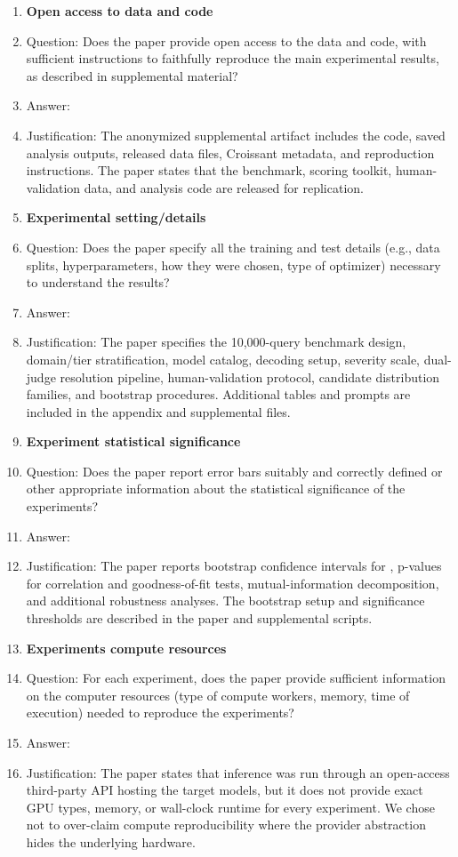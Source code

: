 \begin{enumerate}
\item {\bf Open access to data and code}
    \item[] Question: Does the paper provide open access to the data and code, with sufficient instructions to faithfully reproduce the main experimental results, as described in supplemental material?
    \item[] Answer: \answerYes{}
    \item[] Justification: The anonymized supplemental artifact includes the code, saved analysis outputs, released data files, Croissant metadata, and reproduction instructions. The paper states that the benchmark, scoring toolkit, human-validation data, and analysis code are released for replication.

\item {\bf Experimental setting/details}
    \item[] Question: Does the paper specify all the training and test details (e.g., data splits, hyperparameters, how they were chosen, type of optimizer) necessary to understand the results?
    \item[] Answer: \answerYes{}
    \item[] Justification: The paper specifies the 10,000-query benchmark design, domain/tier stratification, model catalog, decoding setup, severity scale, dual-judge resolution pipeline, human-validation protocol, candidate distribution families, and bootstrap procedures. Additional tables and prompts are included in the appendix and supplemental files.

\item {\bf Experiment statistical significance}
    \item[] Question: Does the paper report error bars suitably and correctly defined or other appropriate information about the statistical significance of the experiments?
    \item[] Answer: \answerYes{}
    \item[] Justification: The paper reports bootstrap confidence intervals for \sdi{}, p-values for correlation and goodness-of-fit tests, mutual-information decomposition, and additional robustness analyses. The bootstrap setup and significance thresholds are described in the paper and supplemental scripts.

\item {\bf Experiments compute resources}
    \item[] Question: For each experiment, does the paper provide sufficient information on the computer resources (type of compute workers, memory, time of execution) needed to reproduce the experiments?
    \item[] Answer: \answerNo{}
    \item[] Justification: The paper states that inference was run through an open-access third-party API hosting the target models, but it does not provide exact GPU types, memory, or wall-clock runtime for every experiment. We chose not to over-claim compute reproducibility where the provider abstraction hides the underlying hardware.


\end{enumerate}
